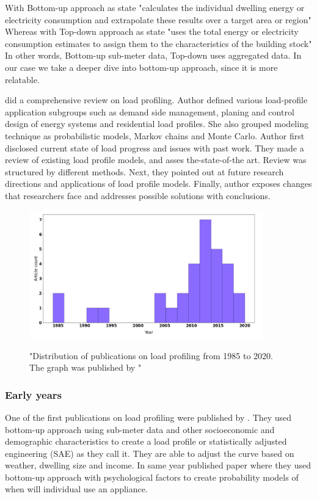 \documentclass[
11pt, %
english, %
singlespacing, %
headsepline, %
]{MastersDoctoralThesis} %
\begin{document}
With Bottom-up approach as \cite{SWAN20091819} state "calculates the individual dwelling energy or electricity consumption and extrapolate these results over a target area or region"
Whereas with Top-down approach as \cite{SWAN20091819} state "uses the total energy or electricity consumption estimates to assign them to the characteristics of the building stock"
In other words, Bottom-up sub-meter data, Top-down uses aggregated data. In our case we take a deeper dive into bottom-up approach, since it is more relatable.

\cite{Review2021} did a comprehensive review on load profiling. Author defined various load-profile application
subgroups such as demand side management, planing and control design of energy systems and residential load profiles. She also 
grouped modeling technique as probabilistic models, Markov chains and Monte Carlo. Author first disclosed current state of load progress and issues with past work. They made a review of existing load profile models,
and asses the-state-of-the art. Review was structured by different methods. Next, they pointed out at future research directions
and applications of load profile models. Finally, author exposes changes that researchers face and addresses possible solutions with conclusions.

\begin{figure}[h!]
	\centering
	\caption{"Distribution of publications on load profiling from 1985 to 2020. The graph was published by \protect\cite{Review2021}"}
	\includegraphics[width=0.9\textwidth]{Figures/publications.png}
	\label{fig:Distribution}
\end{figure}

\subsubsection{Early years}

One of the first publications on load profiling were published by \cite{TRAIN19851103}.
They used bottom-up approach using sub-meter data and other socioeconomic and demographic characteristics 
to create a load profile or statistically adjusted engineering (SAE) as they call it. They are able to adjust the curve based on weather, dwelling size and income. 
In same year \cite{WALKER1985} published paper where they used bottom-up approach with psychological factors to create probability models of when will individual use an appliance.
\end{document}
